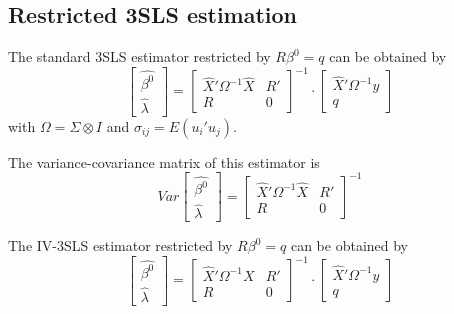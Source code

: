 \subsection{Restricted 3SLS estimation}

The standard 3SLS estimator restricted by $R \beta^0 = q$ can be obtained by
\begin{equation}
   \left[ \begin{array}{c}
      \widehat{\beta^0} \\ \widehat{\lambda}
   \end{array} \right]
   =
   \left[ \begin{array}{cc}
      \widehat{X}' \Omega^{-1} \widehat{X} & R' \\ 
      R & 0
   \end{array} \right]^{-1}
   \cdot
   \left[ \begin{array}{c}
      \widehat{X}' \Omega^{-1} y \\ q 
   \end{array} \right]
\end{equation}
with $\Omega = \Sigma \otimes I$ and
$\sigma_{ij} = E \left( u_i' u_j \right)$.

The variance-covariance matrix of this estimator is
\begin{equation}
   Var 
   \left[ \begin{array}{c}
      \widehat{\beta^0} \\ \widehat{\lambda}
   \end{array} \right] 
   = 
   \left[ \begin{array}{cc}
      \widehat{X}' \Omega^{-1} \widehat{X} & R' \\ 
      R & 0
   \end{array} \right]^{-1}
   \label{eq:cov3slsr}
\end{equation}


The IV-3SLS estimator restricted by $R \beta^0 = q$ can be obtained by
\begin{equation}
   \left[ \begin{array}{c}
      \widehat{\beta^0} \\ \widehat{\lambda}
   \end{array} \right]
   =
   \left[ \begin{array}{cc}
      \widehat{X}' \Omega^{-1} X & R' \\ 
      R & 0
   \end{array} \right]^{-1}
   \cdot
   \left[ \begin{array}{c}
      \widehat{X}' \Omega^{-1} y \\ q 
   \end{array} \right]
\end{equation}


